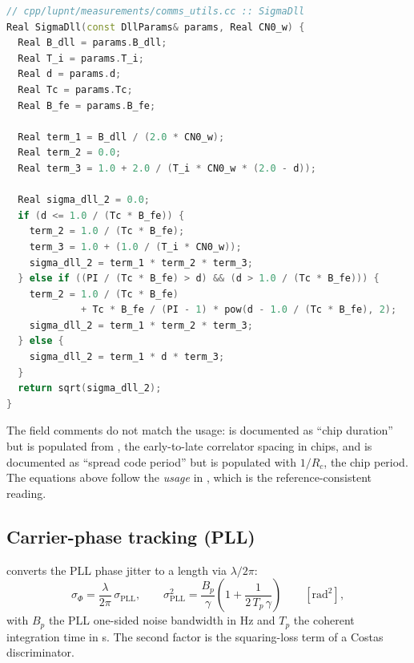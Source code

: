 \begin{lstlisting}[language=cpp, caption={DLL jitter, all three correlator
regimes.}, label={lst:lb-sigmadll}]
// cpp/lupnt/measurements/comms_utils.cc :: SigmaDll
Real SigmaDll(const DllParams& params, Real CN0_w) {
  Real B_dll = params.B_dll;
  Real T_i = params.T_i;
  Real d = params.d;
  Real Tc = params.Tc;
  Real B_fe = params.B_fe;

  Real term_1 = B_dll / (2.0 * CN0_w);
  Real term_2 = 0.0;
  Real term_3 = 1.0 + 2.0 / (T_i * CN0_w * (2.0 - d));

  Real sigma_dll_2 = 0.0;
  if (d <= 1.0 / (Tc * B_fe)) {
    term_2 = 1.0 / (Tc * B_fe);
    term_3 = 1.0 + (1.0 / (T_i * CN0_w));
    sigma_dll_2 = term_1 * term_2 * term_3;
  } else if ((PI / (Tc * B_fe) > d) && (d > 1.0 / (Tc * B_fe))) {
    term_2 = 1.0 / (Tc * B_fe)
             + Tc * B_fe / (PI - 1) * pow(d - 1.0 / (Tc * B_fe), 2);
    sigma_dll_2 = term_1 * term_2 * term_3;
  } else {
    sigma_dll_2 = term_1 * d * term_3;
  }
  return sqrt(sigma_dll_2);
}
\end{lstlisting}

\begin{lupntnote}
The  field comments do not match the usage:
 is documented as ``chip duration'' but is populated from
, the early-to-late correlator spacing in chips, and
 is documented as ``spread code period'' but is populated with
$1/R_c$, the chip period.  The equations above follow the \emph{usage} in
, which is the reference-consistent reading.
\end{lupntnote}

\subsection{Carrier-phase tracking (PLL)}
\label{sec:lb-pll}

 converts the PLL phase jitter
to a length via $\lambda/2\pi$:
\begin{equation}
  \sigma_\Phi
  =
  \frac{\lambda}{2\pi}\,\sigma_\mathrm{PLL},
  \qquad
  \sigma_\mathrm{PLL}^2
  =
  \frac{B_p}{\gamma}
  \left(1 + \frac{1}{2\,T_p\,\gamma}\right)
  \qquad [\si{\radian\squared}],
  \label{eq:lb-sigma-pll}
\end{equation}
with $B_p$ the PLL one-sided noise bandwidth in \si{\hertz} and $T_p$ the
coherent integration time in \si{\second}.  The second factor is the
squaring-loss term of a Costas discriminator.

